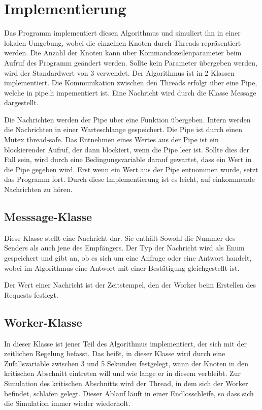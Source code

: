\documentclass{article}
\begin{document}
\section{Implementierung}
Das Programm implementiert diesen Algorithmus und simuliert ihn in einer lokalen Umgebung, wobei die einzelnen Knoten durch Threads repräsentiert werden. Die Anzahl der Knoten kann über Kommandozeilenparameter beim Aufruf des Programm geändert werden. Sollte kein Parameter übergeben werden, wird der Standardwert von 3 verwendet. Der Algorithmus ist in 2 Klassen implementiert. Die Kommunikation zwischen den Threads erfolgt über eine Pipe, welche in pipe.h impementiert ist. Eine Nachricht wird durch die Klasse Message dargestellt.

Die Nachrichten werden der Pipe über eine Funktion übergeben. Intern werden die Nachrichten in einer Warteschlange gespeichert. Die Pipe ist durch einen Mutex thread-safe. Das Entnehmen eines Wertes aus der Pipe ist ein blockierender Aufruf, der dann blockiert, wenn die Pipe leer ist. Sollte dies der Fall sein, wird durch eine Bedingungsvariable darauf gewartet, dass ein Wert in die Pipe gegeben wird. Erst wenn ein Wert aus der Pipe entnommen wurde, setzt das Programm fort. Durch diese Implementierung ist es leicht, auf einkommende Nachrichten zu hören.

\subsection{Messsage-Klasse}
Diese Klasse stellt eine Nachricht dar. Sie enthält Sowohl die Nummer des Senders als auch jene des Empfängers. Der Typ der Nachricht wird als Enum gespeichert und gibt an, ob es sich um eine Anfrage oder eine Antwort handelt, wobei im Algorithmus eine Antwort mit einer Bestätigung gleichgestellt ist.

Der Wert einer Nachricht ist der Zeitstempel, den der Worker beim Erstellen des Requests festlegt.

\subsection{Worker-Klasse}
In dieser Klasse ist jener Teil des Algorithmus implementiert, der sich mit der zeitlichen Regelung befasst. Das heißt, in dieser Klasse wird durch eine Zufallsvariable zwischen 3 und 5 Sekunden festgelegt, wann der Knoten in den kritischen Abschnitt eintreten will und wie lange er in diesem verbleibt. Zur Simulation des kritischen Abschnitts wird der Thread, in dem sich der Worker befindet, schlafen gelegt. Dieser Ablauf läuft in einer Endlosschleife, so dass sich die Simulation immer wieder wiederholt.
\end{document}
